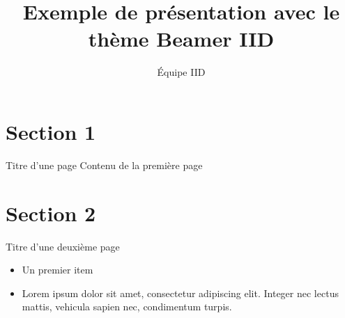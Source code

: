 \documentclass{beamer}
\title{Exemple de présentation avec le thème Beamer IID}
\author{Équipe IID}
\begin{document}
\begin{frame}[plain]
    \maketitle
\end{frame}
\section{Section 1}
\begin{frame}{Titre d'une page}
Contenu de la première page
\end{frame}
\section{Section 2}
\begin{frame}{Titre d'une deuxième page}
\begin{itemize}
	\item Un premier item
	\item Lorem ipsum dolor sit amet, consectetur adipiscing elit. Integer nec lectus mattis, vehicula sapien nec, condimentum turpis.
\end{itemize}
\end{frame}
\end{document}

